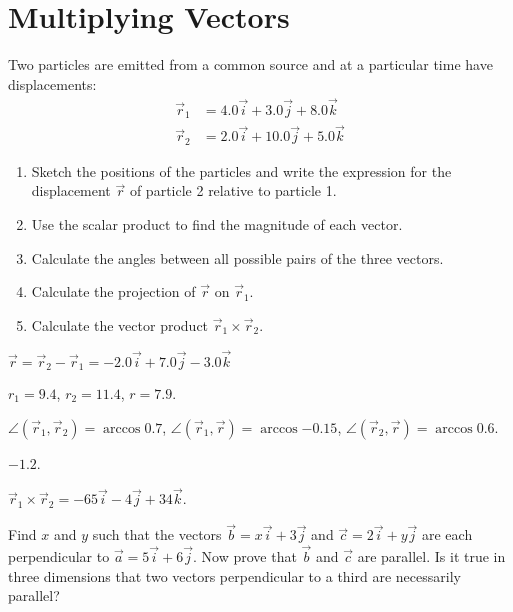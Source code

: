\section{Multiplying Vectors}

\begin{problem}
	Two particles are emitted from a common source and at a particular time have displacements:
	\begin{align*}
		\vec r_1 &= 4.0\vec i + 3.0\vec j + 8.0\vec k \\
		\vec r_2 &= 2.0\vec i + 10.0\vec j + 5.0\vec k
	\end{align*}
	\begin{enumerate}[label=(\alph*)]
		\item Sketch the positions of the particles and write the expression
		for the displacement $\vec r$ of particle 2 relative to particle 1.
		\item Use the scalar product to find the magnitude of each vector.
		\item Calculate the angles between all possible pairs of the three vectors.
		\item Calculate the projection of $\vec r$ on $\vec r_1$.
		\item Calculate the vector product $\vec r_1 \times \vec r_2$. 
	\end{enumerate}
	\begin{solution}
		\begin{enumerate*}[label=(\alph*)]
			\item $\vec r = \vec r_2 - \vec r_1 = - 2.0\vec i + 7.0\vec j -3.0\vec k $
			\item $r_1 = 9.4$, $r_2 = 11.4$, $r = 7.9$.
			\item $\angle(\vec r_1, \vec r_2) = \arccos{0.7} $, $\angle(\vec r_1, \vec r) = \arccos{-0.15}$, $\angle(\vec r_2, \vec r) = \arccos{0.6}$.
			\item $-1.2$.
			\item $\vec r_1 \times \vec r_2 = -65\vec i - 4\vec j + 34 \vec k$. 
		\end{enumerate*}
	\end{solution}
\end{problem}


\begin{problem}
	Find $x$ and $y$ such that the vectors $\vec b = x\vec i + 3 \vec j$ and $\vec c = 2\vec i + y \vec j$ are each perpendicular to $\vec a = 5\vec i + 6\vec j$. Now prove that $\vec b$ and $\vec c$ are parallel. Is it true in three dimensions that two vectors perpendicular to a third are necessarily parallel?
\end{problem}


